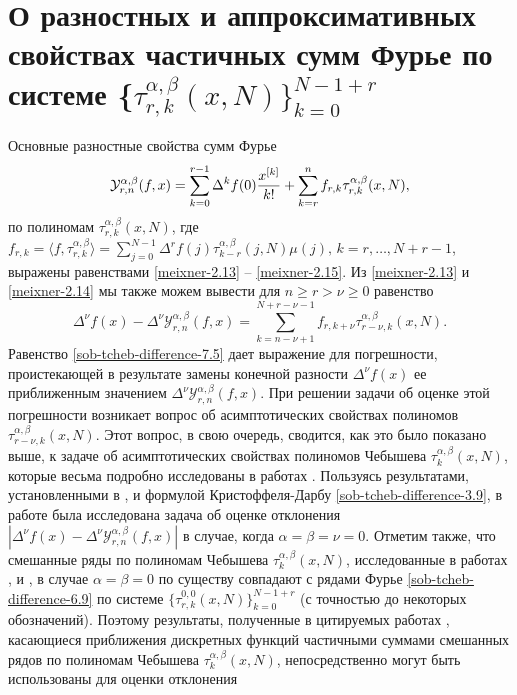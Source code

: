 \section{О разностных и аппроксимативных свойствах частичных сумм Фурье по системе
\{$ \tau_{r,k}^{\alpha,\beta}(x,N)\}_{k=0}^{N-1+r} $}
Основные разностные свойства  сумм Фурье
\begin{equation}\label{sob-tcheb-difference-7.1}
 \mathcal{Y}_{r,n}^{\alpha,\beta}(f,x)= \sum_{k=0}^{r-1}\Delta^kf(0){x^{[k]}\over k!} +\sum_{k=r}^{n}f_{r,k}\tau_{r,k}^{\alpha,\beta}(x,N),
  \end{equation}
по полиномам $\tau_{r,k}^{\alpha,\beta}(x,N)$, где
$f_{r,k}=
\langle f,\tau_{r,k}^{\alpha,\beta} \rangle=
\sum_{j=0}^{N-1}\Delta^rf(j)\tau_{k-r}^{\alpha,\beta}(j,N)\mu(j),\, k=r,\ldots, N+r-1$, выражены равенствами \eqref{meixner-2.13} -- \eqref{meixner-2.15}.
Из \eqref{meixner-2.13} и \eqref{meixner-2.14} мы также можем вывести для $n\ge r>\nu\ge0$ равенство
\begin{equation}\label{sob-tcheb-difference-7.5}
 \Delta^\nu f(x)-\Delta^\nu\mathcal{Y}_{r,n}^{\alpha,\beta}(f,x)= \sum_{k=n-\nu+1}^{N+r-\nu-1} f_{r,k+\nu} \tau_{r-\nu,k}^{\alpha,\beta}(x,N).
  \end{equation}
Равенство  \eqref{sob-tcheb-difference-7.5} дает выражение для погрешности, проистекающей в результате замены конечной разности  $\Delta^\nu f(x)$ ее приближенным значением $\Delta^\nu\mathcal{Y}_{r,n}^{\alpha,\beta}(f,x)$. При решении задачи об оценке этой погрешности возникает вопрос об асимптотических свойствах полиномов $\tau_{r-\nu,k}^{\alpha,\beta}(x,N)$. Этот вопрос, в свою очередь, сводится, как это было показано выше, к задаче об асимптотических свойствах полиномов Чебышева  $\tau_k^{\alpha,\beta}(x,N)$, которые весьма подробно исследованы в работах \cite{sob-tcheb-difference-Shar17,meixner-22}.
Пользуясь результатами, установленными в \cite{sob-tcheb-difference-Shar17,meixner-22}, и формулой Кристоффеля-Дарбу \eqref{sob-tcheb-difference-3.9}, в работе \cite{Haar-Tcheb-Shar15} была исследована задача об оценке отклонения
 $ |\Delta^\nu f(x)-\Delta^\nu\mathcal{Y}_{r,n}^{\alpha,\beta}(f,x)|$   в случае, когда $\alpha=\beta=\nu=0$. 
 Отметим также, что смешанные ряды по полиномам Чебышева $\tau_k^{\alpha,\beta}(x,N)$, исследованные в работах \cite{sob-tcheb-difference-Shar9}, \cite{sob-tcheb-difference-Shar2} и \cite{meixner-12}, в случае $\alpha=\beta=0$ по существу совпадают с рядами Фурье \eqref{sob-tcheb-difference-6.9} по системе $\{ \tau_{r,k}^{0,0}(x,N)\}_{k=0}^{N-1+r} $ (с точностью до некоторых обозначений). Поэтому результаты, полученные в цитируемых работах \cite{sob-tcheb-difference-Shar9,sob-tcheb-difference-Shar2,Haar-Tcheb-Shar11,sob-jac-discrete-Shar17,Haar-Tcheb-Shar13,meixner-12,Haar-Tcheb-Shar15,Haar-Tcheb-Shar16,Haar-Tcheb-Shar19,Haar-Tcheb-Shar18,meixner-18}, касающиеся  приближения дискретных функций частичными суммами смешанных рядов по полиномам Чебышева $\tau_k^{\alpha,\beta}(x,N)$,  непосредственно могут быть использованы для оценки отклонения
